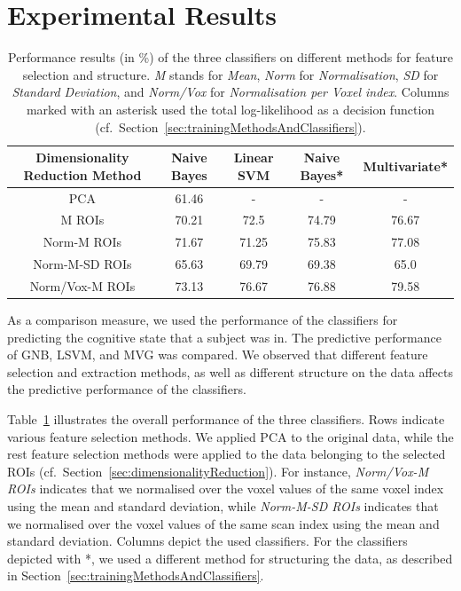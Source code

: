 \documentclass[preprint,journal,11pt]{vgtc}
\begin{document}
\section{Experimental Results}
\label{sec:results}

\begin{table}[htpb]
\centering
{\small
\begin{tabular}{|c|c|c|c|c|}
\hline
\textbf{Dimensionality Reduction Method} & \textbf{Naive Bayes} & \textbf{Linear SVM} & \textbf{Naive Bayes*} & \textbf{Multivariate*} \\ \hline
PCA & 61.46 &  - & - & - \\
M ROIs & 70.21 & 72.5 & 74.79 & 76.67 \\
Norm-M ROIs & 71.67 & 71.25 & 75.83 & 77.08 \\
Norm-M-SD ROIs & 65.63 & 69.79 & 69.38 & 65.0 \\
Norm/Vox-M ROIs & 73.13 & 76.67 & 76.88 & 79.58 \\
\hline
\end{tabular}}
\caption{Performance results (in \%) of the three classifiers on different methods for feature selection and structure. \emph{M} stands for \emph{Mean}, \emph{Norm} for \emph{Normalisation}, \emph{SD} for \emph{Standard Deviation}, and \emph{Norm/Vox} for \emph{Normalisation per Voxel index}. Columns marked with an asterisk used the total log-likelihood as a decision function (cf.~Section~\ref{sec:trainingMethodsAndClassifiers}).}
\label{tab:results}
\end{table}

As a comparison measure, we used the performance of the classifiers for predicting the cognitive state that a subject was in. The predictive performance of GNB, LSVM, and MVG was compared. We observed that different feature selection and extraction methods, as well as different structure on the data affects the predictive performance of the classifiers.

Table~\ref{tab:results} illustrates the overall performance of the three classifiers. Rows indicate various feature selection methods. We applied PCA to the original data, while the rest feature selection methods were applied to the data belonging to the selected ROIs (cf.~Section~\ref{sec:dimensionalityReduction}). For instance, \emph{Norm/Vox-M ROIs} indicates that we normalised over the voxel values of the same voxel index using the mean and standard deviation, while \emph{Norm-M-SD ROIs} indicates that we normalised over the voxel values of the same scan index using the mean and standard deviation. Columns depict the used classifiers. For the classifiers depicted with *, we used a different method for structuring the data, as described in Section~\ref{sec:trainingMethodsAndClassifiers}.
\end{document}
